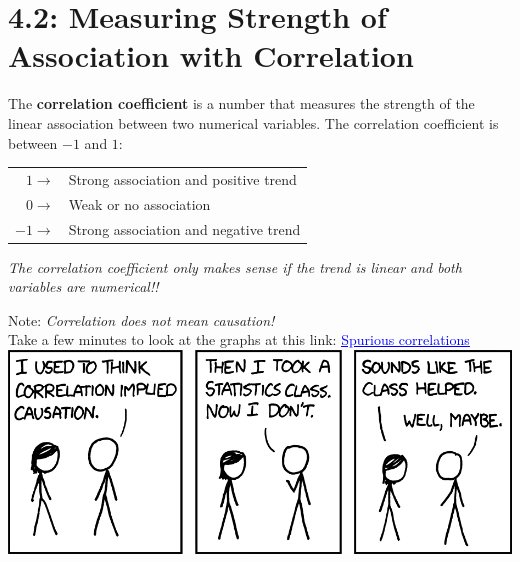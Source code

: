 \documentclass[../mathNotesPreamble]{subfiles}
\begin{document}
  \section{4.2: Measuring Strength of Association with Correlation}
    \begin{defn*}
      The \textbf{correlation coefficient} is a number that measures the strength of the linear association between two numerical variables. The correlation coefficient is between $-1$ and $1$:
      \begin{center}
        \begin{tabular}{@{}rl@{}}\toprule
          $1 \rightarrow$ & Strong association and positive trend\\
          $0 \rightarrow$ & Weak or no association\\
          $-1 \rightarrow$ & Strong association and negative trend\\\bottomrule
        \end{tabular}
      \end{center}
      \emph{The correlation coefficient only makes sense if the trend is linear and both variables are numerical!!}
    \end{defn*}

    \begin{center}
      Note: \emph{Correlation does not mean causation!}\\[\baselineskip]

      Take a few minutes to look at the graphs at this link: \href{https://www.tylervigen.com/spurious-correlations}{\textcolor{blue}{\underline{Spurious correlations}}}\\[\baselineskip]

      \href{https://xkcd.com/552}{\includegraphics[width=0.85\linewidth]{images/correlation_2x_xkcd_552}}
    \end{center}
    \pagebreak
\end{document}
